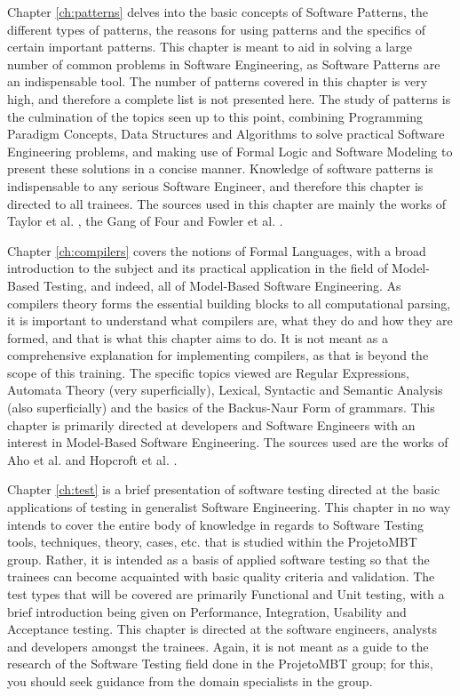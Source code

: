 Chapter \ref{ch:patterns} delves into the basic concepts of Software Patterns, the different types of patterns, the reasons for using patterns and the specifics of certain important patterns. This chapter is meant to aid in solving a large number of common problems in Software Engineering, as Software Patterns are an indispensable tool. The number of patterns covered in this chapter is very high, and therefore a complete list is not presented here. The study of patterns is the culmination of the topics seen up to this point, combining Programming Paradigm Concepts, Data Structures and Algorithms to solve practical Software Engineering problems, and making use of Formal Logic and Software Modeling to present these solutions in a concise manner. Knowledge of software patterns is indispensable to any serious Software Engineer, and therefore this chapter is directed to all trainees. The sources used in this chapter are mainly the works of Taylor et al. \cite{TAYLOR:2009}, the Gang of Four \cite{GAMMA:1995} and Fowler et al. \cite{FOWLER:2002}.

Chapter \ref{ch:compilers} covers the notions of Formal Languages, with a broad introduction to the subject and its practical application in the field of Model-Based Testing, and indeed, all of Model-Based Software Engineering. As compilers theory forms the essential building blocks to all computational parsing, it is important to understand what compilers are, what they do and how they are formed, and that is what this chapter aims to do. It is not meant as a comprehensive explanation for implementing compilers, as that is beyond the scope of this training. The specific topics viewed are Regular Expressions, Automata Theory (very superficially), Lexical, Syntactic and Semantic Analysis (also superficially) and the basics of the Backus-Naur Form of grammars. This chapter is primarily directed at developers and Software Engineers with an interest in Model-Based Software Engineering. The sources used are the works of Aho et al. \cite{AHO:2006} and Hopcroft et al. \cite{HOPCROFT:2000}.

Chapter \ref{ch:test} is a brief presentation of software testing directed at the basic applications of testing in generalist Software Engineering. This chapter in no way intends to cover the entire body of knowledge in regards to Software Testing tools, techniques, theory, cases, etc. that is studied within the ProjetoMBT group. Rather, it is intended as a basis of applied software testing so that the trainees can become acquainted with basic quality criteria and validation. The test types that will be covered are primarily Functional and Unit testing, with a brief introduction being given on Performance, Integration, Usability and Acceptance testing. This chapter is directed at the software engineers, analysts and developers amongst the trainees. Again, it is not meant as a guide to the research of the Software Testing field done in the ProjetoMBT group; for this, you should seek guidance from the domain specialists in the group.
